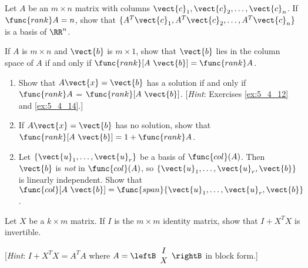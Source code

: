 \begin{multicols}{2}
\begin{ex}
Let $A$ be an $m \times n$ matrix with columns $\vect{c}_{1}, \vect{c}_{2}, \dots, \vect{c}_{n}$. If $\func{rank} A = n$, show that $\{A^{T}\vect{c}_{1}, A^{T}\vect{c}_{2}, \dots, A^{T}\vect{c}_{n}\}$ is a basis of $\RR^n$.
\end{ex}

\begin{ex}
	\label{ex:5_4_14}
If $A$ is $m \times n$ and $\vect{b}$ is $m \times 1$, show that $\vect{b}$ lies in the column space of $A$ if and only if \newline $\func{rank} [A \ \vect{b}] = \func{rank} A$.
\end{ex}

\begin{ex}
\begin{enumerate}[label={\alph*.}]
\item Show that $A\vect{x} = \vect{b}$ has a solution if and only if $\func{rank} A$ = $\func{rank}[A \ \vect{b}]$. [\textit{Hint}: Exercises \ref{ex:5_4_12} and \ref{ex:5_4_14}.] 

\item If $A\vect{x} = \vect{b}$ has no solution, show that \newline $\func{rank}[A \ \vect{b}] = 1 + \func{rank} A$.

\end{enumerate}
\begin{sol}
\begin{enumerate}[label={\alph*.}]
\setcounter{enumi}{1}
\item  Let $\{\vect{u}_{1}, \dots, \vect{u}_{r}\}$ be a basis of $\func{col}(A)$. Then $\vect{b}$ is \textit{not} in $\func{col}(A)$, so $\{\vect{u}_{1}, \dots, \vect{u}_{r}, \vect{b}\}$ is linearly independent. Show that $\func{col}[A \ \vect{b}] = \func{span}\{\vect{u}_{1}, \dots, \vect{u}_{r}, \vect{b}\}$.

\end{enumerate}
\end{sol}
\end{ex}

\begin{ex}
Let $X$ be a $k \times m$ matrix. If $I$ is the $m \times m$ identity matrix, show that $I + X^{T}X$ is invertible.


[\textit{Hint}: $I + X^{T}X = A^{T}A$ where 
$A = \leftB \begin{array}{c}
I\\
X
\end{array} \rightB$ in block form.]
\end{ex}


\end{multicols}
